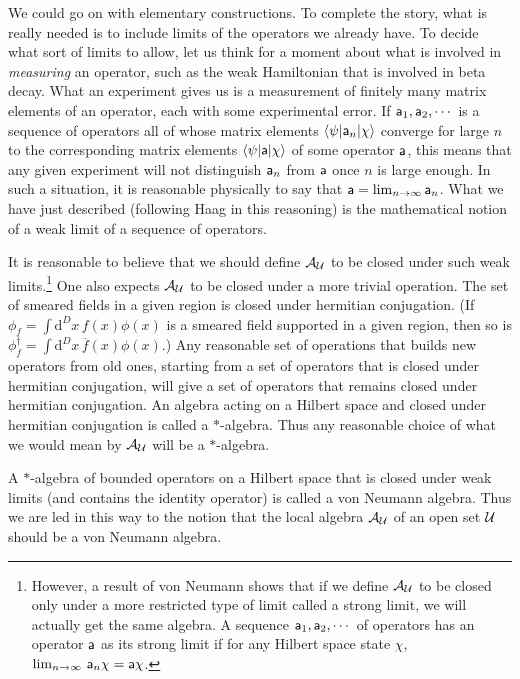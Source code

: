 \documentclass[12pt]{article}
\def\a{{\sf a}}
\def\bar{\overline}
\def\ra{\rangle}
\def\la{\langle}
\numberwithin{equation}{section}
\def\d{\mathrm d}
\def\bar{\overline}
\def\A{{\mathcal A}}
\def\bar{\overline}
\begin{document}
We could go on with elementary constructions.  To complete the story, what is really needed is to include limits 
of the operators we already have.   
To decide what sort of limits to allow, let us think for a moment about what is involved in {\it measuring} an operator, such as
the weak Hamiltonian that is involved in beta decay.   What an experiment gives us is a measurement of 
finitely many matrix elements of an operator, each with some experimental error.  If $\a_1,\a_2,\cdots $ is a sequence
of operators  all of whose matrix elements $\la\psi|\a_n|\chi\ra $   converge for large $n$ to the corresponding matrix
elements $\la\psi|\a|\chi\ra$ of some operator $\a$,  
this means that any given experiment will not distinguish $\a_n$ from $\a$ once $n$ is large enough.
In such a situation, it is reasonable physically to say that $\a=\lim_{n\to\infty}\a_n$.   What we have just described (following Haag \cite{Haag}
in this reasoning) is the
mathematical notion of a weak limit of a sequence of operators.
 
 It is reasonable to believe that we should define $\A_\U$ to be closed under such weak limits.\footnote{However, a result of
 von Neumann shows that if we define $\A_\U$ to be closed only under a more restricted type of limit called a strong limit,
 we will actually get the same algebra.  A sequence $\a_1,\a_2,\cdots$ of operators has an operator $\a$ as its strong limit
 if for any Hilbert space state $\chi$, $\lim_{n\to\infty} \,\a_n\chi=\a\chi$.}    One also expects $\A_\U$
 to be closed under a more trivial operation.   
 The set of smeared fields in a given region is closed under hermitian conjugation.  (If $\phi_f=\int \d^Dx \,f(x)\phi(x)$ is a smeared
field supported in a given region, then so is $\phi_f^\dagger=\int \d^Dx\,\bar f(x)\phi(x)$.)   Any reasonable set of operations
that builds new operators from old ones, starting from a set of operators that is closed under hermitian conjugation,
 will give a set of operators that remains closed under hermitian conjugation.
  An algebra acting on a Hilbert space and closed under hermitian
conjugation is called a $*$-algebra.  Thus any reasonable choice of what we would mean by $\A_\U$ will be a $*$-algebra.  

A $*$-algebra of bounded operators on a Hilbert space that is closed under weak limits  (and contains the identity operator)
is called a von Neumann algebra.   Thus
we are led in this way to the notion that the local algebra $\A_\U$ of an open set ${\mathcal U}$ should be a von Neumann algebra.
\end{document}
